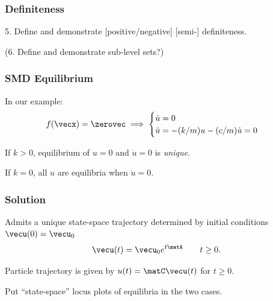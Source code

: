 \documentclass[12pt]{beamer}
\begin{document}
\begin{frame}
\frametitle{Definiteness}

5. Define and demonstrate [positive/negative] [semi-] definiteness.

(6. Define and demonstrate sub-level sets?)

\end{frame}





\begin{frame}
\frametitle{SMD Equilibrium}

\begin{itemize}
\vitem In our example:
\[
f(\vecx) = \zerovec \implies
\begin{cases}
	\dot u = 0	\\
	\ddot u = -(k/m) u - (c/m) \dot u = 0
\end{cases}
\]

\vitem If $k > 0$, equilibrium of $u = 0$ and $\dot u = 0$ is \emph{unique}.

\vitem If $k = 0$, all $u$ are equilibria when $\dot u = 0$.
\end{itemize}
\end{frame}



\begin{frame}
\frametitle{Solution}

\begin{itemize}

\vitem Admits a unique state-space trajectory determined by initial conditions $\vecu(0) = \vecu_0$
\[
  \vecu(t) = \vecu_0 e^{t \matA }
  \qquad t \geq 0.
\]

\vitem Particle trajectory is given by $u(t) = \matC \vecu(t)$ for $t \geq 0$.

\end{itemize}
\vfill\null

\end{frame}




\begin{frame}
Put ``state-space'' locus plots of equilibria in the two cases.
\end{frame}
\end{document}
